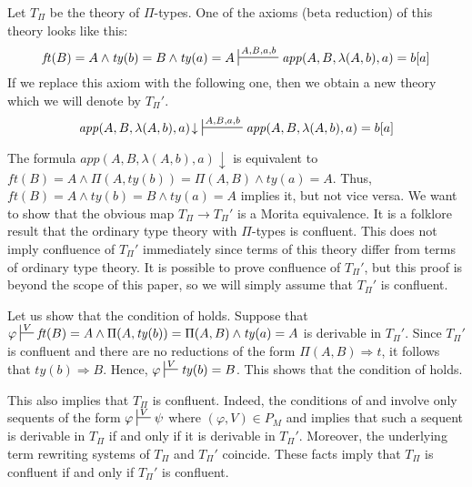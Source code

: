 \documentclass[reqno]{amsart}
\theoremstyle{definition}
\theoremstyle{remark}
\newcommand{\app}{\mathit{app}}
\newcommand{\ft}{\mathit{ft}}
\newcommand{\ty}{\mathit{ty}}
\numberwithin{figure}{section}
\begin{document}
\begin{example}
Let $T_\Pi$ be the theory of $\Pi$-types.
One of the axioms (beta reduction) of this theory looks like this:
\[ \ft(B) = A \land \ty(b) = B \land \ty(a) = A \sststile{}{A,B,a,b} \app(A,B,\lambda(A,b),a) = b[a] \]
If we replace this axiom with the following one, then we obtain a new theory which we will denote by $T_\Pi'$.
\[ \app(A,B,\lambda(A,b),a)\!\downarrow\ \sststile{}{A,B,a,b} \app(A,B,\lambda(A,b),a) = b[a] \]

The formula $\app(A,B,\lambda(A,b),a)\!\downarrow$ is equivalent to $\ft(B) = A \land \Pi(A,\ty(b)) = \Pi(A,B) \land \ty(a) = A$.
Thus, $\ft(B) = A \land \ty(b) = B \land \ty(a) = A$ implies it, but not vice versa.
We want to show that the obvious map $T_\Pi \to T_\Pi'$ is a Morita equivalence.
It is a folklore result that the ordinary type theory with $\Pi$-types is confluent.
This does not imply confluence of $T_\Pi'$ immediately since terms of this theory differ from terms of ordinary type theory.
It is possible to prove confluence of $T_\Pi'$, but this proof is beyond the scope of this paper, so we will simply assume that $T_\Pi'$ is confluent.

Let us show that the condition of  holds.
Suppose that $\varphi \sststile{}{V} \ft(B) = A \land \Pi(A,\ty(b)) = \Pi(A,B) \land \ty(a) = A$ is derivable in $T_\Pi'$.
Since $T_\Pi'$ is confluent and there are no reductions of the form $\Pi(A,B) \Rightarrow t$, it follows that $\ty(b) \Rightarrow B$.
Hence, $\varphi \sststile{}{V} \ty(b) = B$.
This shows that the condition of  holds.

This also implies that $T_\Pi$ is confluent.
Indeed, the conditions of  and  involve only sequents of the form $\varphi \sststile{}{V} \psi$ where $(\varphi,V) \in P_M$
and  implies that such a sequent is derivable in $T_\Pi$ if and only if it is derivable in $T_\Pi'$.
Moreover, the underlying term rewriting systems of $T_\Pi$ and $T_\Pi'$ coincide.
These facts imply that $T_\Pi$ is confluent if and only if $T_\Pi'$ is confluent.
\end{example}
\end{document}
